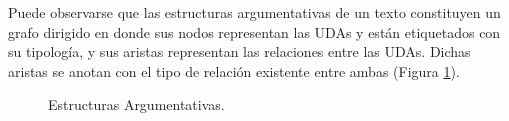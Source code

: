 \documentclass[a4paper,11pt,twocolumn,twoside]{article}
\begin{document}
Puede observarse que las estructuras argumentativas de un texto constituyen un grafo dirigido 
en donde sus nodos representan las UDAs y están etiquetados con su tipología, y sus aristas representan las 
relaciones entre las UDAs. Dichas aristas se anotan con el tipo de relación existente entre ambas 
(Figura \ref{fig:arg_struct}).

\begin{figure}[h]
	\centering
	
	\caption{Estructuras Argumentativas.}
	\label{fig:arg_struct}
\end{figure}




\end{document}
